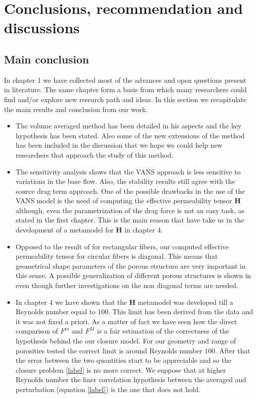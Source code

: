 \chapter{Conclusions, recommendation and discussions}



\section{Main conclusion}

In chapter 1 we have collected most of the advances and open questions present in literature. The same chapter form a basis from which many researchers could find and/or explore new research path and ideas. In this section we recapitulate the main results and conclusion from our work.

\begin{itemize}


\item The volume averaged method has been detailed in his aspects and the key hypothesis has been stated. Also some of the new extensions of the method has been included in the discussion that we hope we could help new researchers that approach the study of this method.

\item The sensitivity analysis shows that the VANS approach is less sensitive to variations in the base flow. Also, the stability results still agree with the source drag term approach. One of the possible drawbacks in the use of the VANS model is the need of computing the effective permeability tensor $\mathbf{H}$ although, even the parametrization of the drag force is not an easy task, as stated in the first chapter. This is the main reason that have take us in the development of a metamodel for $\mathbf{H}$ in chapter 4.

\item Opposed to the result of \citet{lasseux} for rectangular fibers, our computed effective permeability tensor for circular fibers is diagonal. This means that geometrical shape parameters of the porous structure are very important in this sense. A possible generalization of different porous structures is shown in \citet{pauthenet} even though further investigations on the non diagonal terms are needed.

\item In chapter 4 we have shown that the $\mathbf{H}$ metamodel was developed till a Reynolds number equal to $100$. This limit has been derived from the data and it was not fixed a priori. As a matter of fact we have seen how the direct comparison of $F^m$ and $F^M$ is a fair estimation of the correctness of the hypothesis behind the our closure model. For our geometry and range of porosities tested the correct limit is around Reynolds number $100$. After that the error between the two quantities start to be appreciable and so the closure problem \eqref{label} is no more correct. We suppose that at higher Reynolds number the liner correlation hypothesis between the averaged and perturbation (equation \eqref{label}) is the one that does not hold.


\end{itemize}
